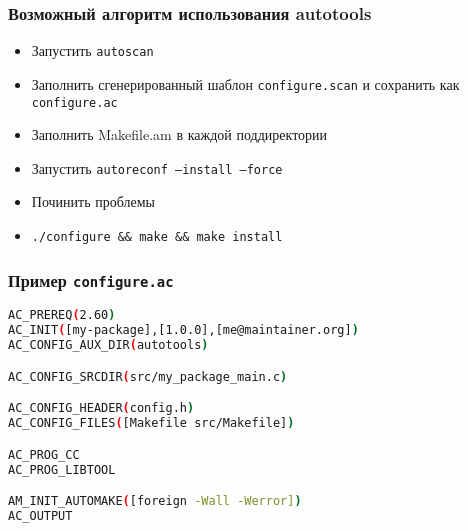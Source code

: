 
\begin{frame}[fragile]
 \frametitle{Возможный алгоритм использования autotools}
 \begin{itemize}
  \item Запустить \texttt{autoscan}
  \item Заполнить сгенерированный шаблон \texttt{configure.scan} и сохранить как \texttt{configure.ac}
  \item Заполнить Makefile.am в каждой поддиректории
  \item Запустить \texttt{autoreconf --install --force}
  \item Починить проблемы
  \item \verb+./configure && make && make install+
 \end{itemize}
\end{frame}

\begin{frame}[fragile]
\frametitle{Пример \texttt{configure.ac}}
\begin{lstlisting}[language=sh]
AC_PREREQ(2.60)
AC_INIT([my-package],[1.0.0],[me@maintainer.org])
AC_CONFIG_AUX_DIR(autotools)

AC_CONFIG_SRCDIR(src/my_package_main.c)

AC_CONFIG_HEADER(config.h)
AC_CONFIG_FILES([Makefile src/Makefile])

AC_PROG_CC
AC_PROG_LIBTOOL

AM_INIT_AUTOMAKE([foreign -Wall -Werror])
AC_OUTPUT
\end{lstlisting}
\end{frame}


